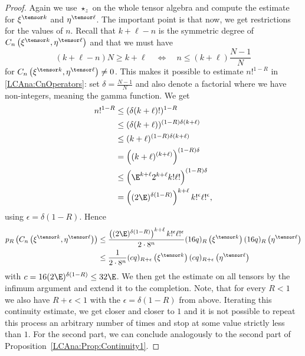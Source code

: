 \begin{proof}
    Again we use $\star_z$ on the whole tensor algebra and compute the 
    estimate for $\xi^{\tensor k}$ and $\eta^{\tensor \ell}$. The important 
    point is that now, we get restrictions for the values of $n$.
    Recall that $k + \ell - n$ is the symmetric degree of $C_n \left( 
    \xi^{\tensor k}, \eta^{\tensor \ell} \right)$ and that we must have
    \begin{equation*}
	    	(k + \ell - n) N
    		\geq
    		k + \ell
    		\quad 
    		\Longleftrightarrow 
    		\quad
    		n 
    		\leq
    		(k + \ell)
    		\frac{N - 1}{N}
    \end{equation*}
    for $C_n \left( \xi^{\tensor k}, \eta^{\tensor \ell} \right) \neq 0$. 
    This makes it possible to estimate $n!^{1-R}$ in 
    \eqref{LCAna:CnOperators}: set $\delta = \frac{N - 1}{N}$ and also denote 
    a factorial where we have non-integers, meaning the gamma function. We get
    \begin{align*}
        n!^{1-R}
        & \leq
        (\delta (k + \ell)!)^{1 - R}
        \\
        & \leq
        (\delta (k + \ell))^{(1 - R) \delta (k + \ell)}
        \\
        & \leq
        (k + \ell)^{(1 - R) \delta (k + \ell)}
        \\
        & =
        \left(
            (k + \ell)^{(k + \ell)}
        \right)^{(1 - R) \delta}
        \\
        & \leq
        \left(
            \E^{k + \ell} 2^{k + \ell} k! \ell!
        \right)^{(1-R) \delta}
        \\
        & =
        \left( (2 \E)^{\delta (1-R)} \right)^{k + \ell}
        k!^{\epsilon} \ell!^{\epsilon},
    \end{align*}
    using $\epsilon = \delta (1 - R)$. Hence
    \begin{align*}
        p_R \left(
        	C_n \left(
        		\xi^{\tensor k}, \eta^{\tensor \ell}
        	\right)
        \right)
        & \leq
        \frac{
        	\left(
        		(2 \E)^{\delta (1 - R)}
        	\right)^{k + \ell}
        	k!^{\epsilon}
        	\ell!^{\epsilon}
        }{2 \cdot 8^n}
        (16 q)_R \left( \xi^{\tensor k} \right)
        (16 q)_R \left( \eta^{\tensor \ell} \right)
        \\
        & \leq
        \frac{1}{2 \cdot 8^n}
        (c q)_{R + \epsilon} \left( \xi^{\tensor k} \right)
        (c q)_{R + \epsilon} \left( \eta^{\tensor \ell} \right)
    \end{align*}
    with $c = 16 (2 \E)^{\delta (1 - R)} \leq 32 \E$.
    We then get the estimate on all tensors by the infimum argument and extend 
    it to the completion. Note, that for every $R < 1$ we also have 
    $R + \epsilon < 1$ with the $\epsilon = \delta(1-R)$ from above. Iterating 
    this continuity estimate, we get closer and closer to $1$ and it is not 
    possible to repeat this process an arbitrary number of times and stop at 
    some value strictly less than $1$. For the second part, we can conclude 
    analogously to the second part of 
    Proposition~\ref{LCAna:Prop:Continuity1}.
\end{proof}
